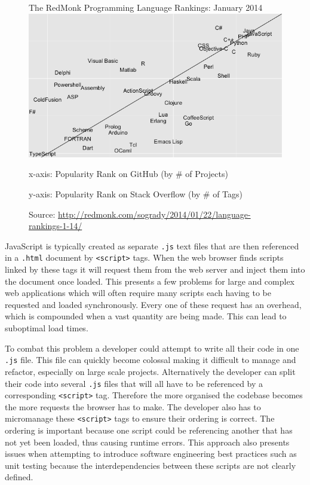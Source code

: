 \documentclass[final]{cmpreport}
\begin{document}

\begin{figure}[h!]{The RedMonk Programming Language Rankings: January 2014 \label{ranking}}
  \includegraphics[width=1.0\textwidth]{lang-rank-114-wm.png}
  \begin{tablenotes}
    \item x-axis: Popularity Rank on GitHub (by \# of Projects)
    \item y-axis: Popularity Rank on Stack Overflow (by \# of Tags)
    \item Source: \url{http://redmonk.com/sogrady/2014/01/22/language-rankings-1-14/}
  \end{tablenotes}
\end{figure}

JavaScript is typically created as separate \texttt{.js} text files that are then referenced in a \texttt{.html} document by \texttt{<script>} tags. When the web browser finds scripts linked by these tags it will request them from the web server and inject them into the document once loaded. This presents a few problems for large and complex web applications which will often require many scripts each having to be requested and loaded synchronously. Every one of these request has an overhead, which is compounded when a vast quantity are being made. This can lead to suboptimal load times.

To combat this problem a developer could attempt to write all their code in one \texttt{.js} file. This file can quickly become colossal making it difficult to manage and refactor, especially on large scale projects. Alternatively the developer can split their code into several \texttt{.js} files that will all have to be referenced by a corresponding \texttt{<script>} tag. Therefore the more organised the codebase becomes the more requests the browser has to make. The developer also has to micromanage these \texttt{<script>} tags to ensure their ordering is correct. The ordering is important because one script could be referencing another that has not yet been loaded, thus causing runtime errors. This approach also presents issues when attempting to introduce software engineering best practices such as unit testing because the interdependencies between these scripts are not clearly defined.
\end{document}
